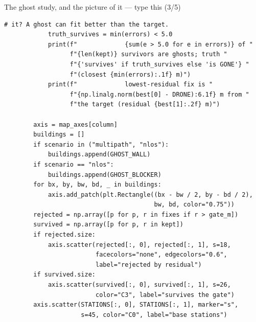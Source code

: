 \documentclass[10pt]{beamer}
\begin{document}
\begin{frame}[fragile]{The ghost study, and the picture of it --- type this (3/5)}
\begin{lstlisting}[basicstyle=\ttfamily\tiny]
            # it? A ghost can fit better than the target.
            truth_survives = min(errors) < 5.0
            print(f"             {sum(e > 5.0 for e in errors)} of "
                  f"{len(kept)} survivors are ghosts; truth "
                  f"{'survives' if truth_survives else 'is GONE'} "
                  f"(closest {min(errors):.1f} m)")
            print(f"             lowest-residual fix is "
                  f"{np.linalg.norm(best[0] - DRONE):6.1f} m from "
                  f"the target (residual {best[1]:.2f} m)")

        axis = map_axes[column]
        buildings = []
        if scenario in ("multipath", "nlos"):
            buildings.append(GHOST_WALL)
        if scenario == "nlos":
            buildings.append(GHOST_BLOCKER)
        for bx, by, bw, bd, _ in buildings:
            axis.add_patch(plt.Rectangle((bx - bw / 2, by - bd / 2),
                                         bw, bd, color="0.75"))
        rejected = np.array([p for p, r in fixes if r > gate_m])
        survived = np.array([p for p, r in kept])
        if rejected.size:
            axis.scatter(rejected[:, 0], rejected[:, 1], s=18,
                         facecolors="none", edgecolors="0.6",
                         label="rejected by residual")
        if survived.size:
            axis.scatter(survived[:, 0], survived[:, 1], s=26,
                         color="C3", label="survives the gate")
        axis.scatter(STATIONS[:, 0], STATIONS[:, 1], marker="s",
                     s=45, color="C0", label="base stations")
\end{lstlisting}
\end{frame}
\end{document}

